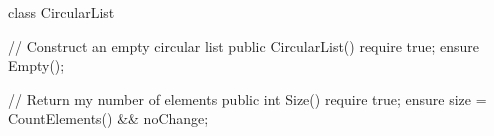 class CircularList {

  // Construct an empty circular list 
  public CircularList()
    require true;  
    ensure Empty();  

  // Return my number of elements 
  public int Size()
    require true;  
    ensure size = CountElements() && noChange;  
}
